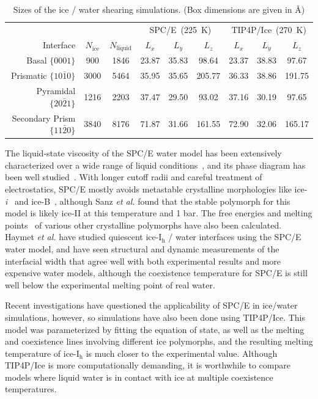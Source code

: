 \begin{table}[h]
\centering
\caption{Sizes of the ice / water shearing simulations. (Box
  dimensions are given in \AA)\label{tab:sizes}}
\begin{tabular}{r|cc|ccc|ccc}
\toprule
 & & & \multicolumn{3}{c|}{SPC/E~(225~K)} &  \multicolumn{3}{c}{TIP4P/Ice~(270~K)}\\
 Interface & $N_\mathrm{ice}$ &
 $N_\mathrm{liquid}$ & $L_x$ & $L_y$ & $L_z$ & $L_x$ & $L_y$ & $L_z$ \\
\midrule
Basal  $\{0001\}$                 & 900 & 1846  & 23.87 & 35.83 & 98.64  & 23.37 & 38.83 & 97.67  \\
Prismatic  $\{10\bar{1}0\}$       & 3000 & 5464 & 35.95 & 35.65 & 205.77 & 36.33 & 38.86 & 191.75 \\
Pyramidal  $\{20\bar{2}1\}$       & 1216 & 2203 & 37.47 & 29.50 & 93.02  & 37.16 & 30.19 & 97.65  \\
Secondary Prism  $\{11\bar{2}0\}$ & 3840 & 8176 & 71.87 & 31.66 & 161.55 & 72.90 & 32.06 & 165.17 \\
\bottomrule
\end{tabular}
\end{table}

The liquid-state viscosity of the SPC/E water model has been
extensively characterized over a wide range of liquid
conditions~\cite{Kuang2012}, and its phase diagram has been well
studied~\cite{Baez1995,Bryk2004,Sanz2004a,Fennell2005}. With longer
cutoff radii and careful treatment of electrostatics, SPC/E mostly
avoids metastable crystalline morphologies like
ice-\textit{i}~\cite{Fennell2005} and ice-B~\cite{Baez1995}, although
Sanz \textit{et al.}\cite{Sanz2004a} found that the stable polymorph
for this model is likely ice-II at this temperature and 1 bar. The
free energies and melting
points~\cite{Baez1995,Arbuckle2002,Gay2002,Bryk2002,Bryk2004,Sanz2004a,Fennell2005,Fernandez2006,Abascal2007,Vrbka2007}
of various other crystalline polymorphs have also been calculated.
Haymet \textit{et al.}\cite{Bryk2002} have studied quiescent
ice-I$_\mathrm{h}$ / water interfaces using the SPC/E water model, and
have seen structural and dynamic measurements of the interfacial width
that agree well with both experimental results and more expensive
water models, although the coexistence temperature for SPC/E is still
well below the experimental melting point of real water.  

Recent investigations have questioned the applicability of SPC/E in
ice/water simulations,\cite{Vega2005c,Vega2011a,Gladich2012,Gallo2016}
however, so simulations have also been done using
TIP4P/Ice.\cite{Abascal2005} This model was parameterized by fitting
the equation of state, as well as the melting and coexistence lines
involving different ice polymorphs, and the resulting melting
temperature of ice-I$_\mathrm{h}$ is much closer to the experimental
value.\cite{Abascal2005} Although TIP4P/Ice is more computationally
demanding, it is worthwhile to compare models where liquid water is in
contact with ice at multiple coexistence temperatures.

